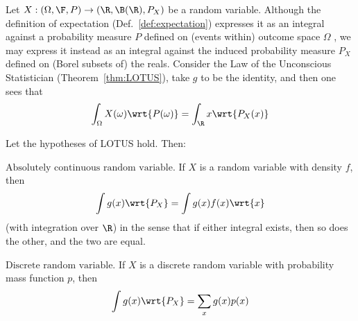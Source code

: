 \documentclass{article} %
\begin{document}
\begin{remark}
Let $X: (\Omega, \F, P) \to (\R, \B(\R), P_X)$ be a random variable.  Although the definition of expectation (Def.~\ref{def:expectation}) expresses it as an integral against a probability measure $P$ defined on (events within) outcome space $\Omega$ , we may express it instead as an integral against the induced probability measure $P_X$ defined on (Borel subsets of) the reals.  Consider the Law of the Unconscious Statistician (Theorem~\ref{thm:LOTUS}), take $g$ to be the identity, and then one sees that
\[ \int_\Omega X(\omega) \wrt{P(\omega)} = \int_\R x \wrt{P_X(x)} \] 
\end{remark}

\begin{examples}

Let the hypotheses of LOTUS hold.  Then:

\begin{alphabate}
\item $\boxed{\text{Absolutely continuous random variable.}}$ If $X$ is a random variable with density $f$, then 
\[\int g(x) \wrt{P_X} = \int g(x) f(x) \wrt{x}\]
(with integration over $\R$) in the sense that if either integral exists, then so does the other, and the two are equal.
\item $\boxed{\text{Discrete random variable.}}$ If $X$ is a discrete random variable with probability mass function $p$, then 
\[\int g(x) \wrt{P_X} = \sum_{x} g(x) p(x)\]
\end{alphabate}

\label{ex:applying_LOTUS_to_absolutely_continuous_or_discrete_random_variables}
\end{examples}
\end{document}
